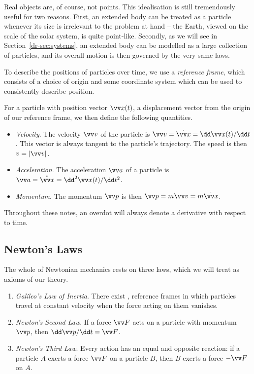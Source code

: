 Real objects are, of course, not points. This idealisation is still tremendously useful for two reasons. First, an extended body can be treated as a particle whenever its size is irrelevant to the problem at hand -- the Earth, viewed on the scale of the solar system, is quite point-like. Secondly, as we will see in Section~\ref{dr-sec:systems}, an extended body can be modelled as a large collection of particles, and its overall motion is then governed by the very same laws.

To describe the positions of particles over time, we use a \emph{reference frame}, which consists of a choice of origin and some coordinate system which can be used to consistently describe position.

For a particle with position vector $\vv x(t)$, a displacement vector from the origin of our reference frame, we then define the following quantities.
\begin{itemize}
	\item \emph{Velocity}. The velocity $\vv v$ of the particle is $\vv v = \dot{\vv x} = \dd \vv x(t) / \dd t$. This vector is always tangent to the particle's trajectory. The speed is then $v = |\vv v|$.
	\item \emph{Acceleration}. The acceleration $\vv a$ of a particle is $\vv a = \ddot{\vv x} = \dd^2 \vv x(t)/\dd t^2$.
	\item \emph{Momentum}. The momentum $\vv p$ is then $\vv p = m \vv v = m \dot{\vv x}$.
\end{itemize}
Throughout these notes, an overdot will always denote a derivative with respect to time.

\subsection{Newton's Laws}

The whole of Newtonian mechanics rests on three laws, which we will treat as axioms of our theory.

\begin{law}
	\begin{enumerate}
		\item \emph{Galileo's Law of Inertia}. There exist , reference frames in which particles travel at constant velocity when the force acting on them vanishes.
		\item \emph{Newton's Second Law}. If a force $\vv F$ acts on a particle with momentum $\vv p$, then $\dd\vv p/\dd t = \vv F$.
		\item \emph{Newton's Third Law}. Every action has an equal and opposite reaction: if a particle $A$ exerts a force $\vv F$ on a particle $B$, then $B$ exerts a force $-\vv F$ on $A$.
	\end{enumerate}
\end{law}

